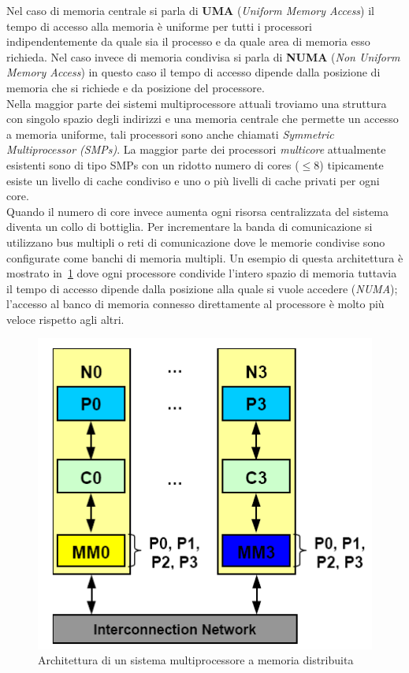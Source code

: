 Nel caso di memoria centrale si parla di \textbf{UMA} (\emph{Uniform Memory Access}) il tempo di accesso alla memoria è uniforme per tutti i processori indipendentemente da quale sia il processo e da quale area di memoria esso richieda. Nel caso invece di memoria condivisa si parla di \textbf{NUMA} (\emph{Non Uniform Memory Access}) in questo caso il tempo di accesso dipende dalla posizione di memoria che si richiede e da posizione del processore.\\
Nella maggior parte dei sistemi multiprocessore attuali troviamo una struttura con singolo spazio degli indirizzi e una memoria centrale che permette un accesso a memoria uniforme, tali processori sono anche chiamati \emph{Symmetric Multiprocessor (SMPs)}. La maggior parte dei processori \emph{multicore} attualmente esistenti sono di tipo SMPs con un ridotto numero di cores ($\leq 8$) tipicamente esiste un livello di cache condiviso e uno o più livelli di cache privati per ogni core.\\
Quando il numero di core invece aumenta ogni risorsa centralizzata del sistema diventa un collo di bottiglia. Per incrementare la banda di comunicazione si utilizzano bus multipli o reti di comunicazione dove le memorie condivise sono configurate come banchi di memoria multipli. Un esempio di questa architettura è mostrato in \figurename\,\ref{fig:dsmarch} dove ogni processore condivide l'intero spazio di memoria tuttavia il tempo di accesso dipende dalla posizione alla quale si vuole accedere (\emph{NUMA}); l'accesso al banco di memoria connesso direttamente al processore è molto più veloce rispetto agli altri.
\begin{figure}[htb]
\centering
\includegraphics[scale=0.5]{img/dsmarch.png}
\caption{Architettura di un sistema multiprocessore a memoria distribuita}\label{fig:dsmarch}
\end{figure}
